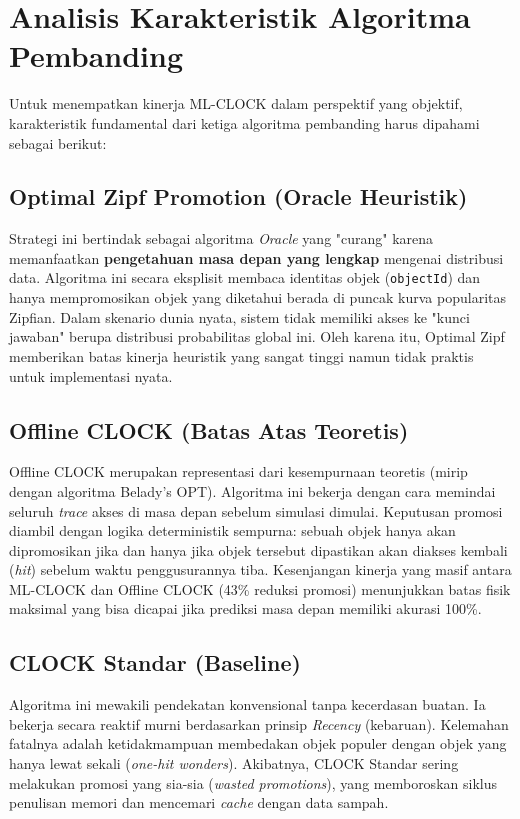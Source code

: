 \section{Analisis Karakteristik Algoritma Pembanding}

Untuk menempatkan kinerja ML-CLOCK dalam perspektif yang objektif,
karakteristik fundamental dari ketiga algoritma pembanding harus
dipahami sebagai berikut:

\subsection{Optimal Zipf Promotion (Oracle Heuristik)}
Strategi ini bertindak sebagai algoritma \textit{Oracle} yang "curang" karena
memanfaatkan \textbf{pengetahuan masa depan yang lengkap} mengenai
distribusi data.
Algoritma ini secara eksplisit membaca identitas objek
(\texttt{objectId}) dan hanya mempromosikan
objek yang diketahui berada di puncak kurva popularitas Zipfian.
Dalam skenario dunia nyata, sistem tidak memiliki akses ke "kunci jawaban"
berupa distribusi probabilitas global ini.
Oleh karena itu, Optimal Zipf memberikan batas kinerja heuristik yang
sangat tinggi namun tidak praktis untuk implementasi nyata.

\subsection{Offline CLOCK (Batas Atas Teoretis)}
Offline CLOCK merupakan representasi dari kesempurnaan teoretis
(mirip dengan algoritma Belady's OPT).
Algoritma ini bekerja dengan cara memindai seluruh \textit{trace}
akses di masa depan sebelum simulasi dimulai.
Keputusan promosi diambil dengan logika deterministik sempurna:
sebuah objek hanya akan dipromosikan jika dan hanya jika objek tersebut
dipastikan akan diakses kembali (\textit{hit}) sebelum waktu
penggusurannya tiba.
Kesenjangan kinerja yang masif antara ML-CLOCK dan Offline CLOCK
(43\% reduksi promosi)
menunjukkan batas fisik maksimal yang bisa dicapai jika prediksi masa
depan memiliki akurasi 100\%.

\subsection{CLOCK Standar (Baseline)}
Algoritma ini mewakili pendekatan konvensional tanpa kecerdasan buatan.
Ia bekerja secara reaktif murni berdasarkan prinsip \textit{Recency} (kebaruan).
Kelemahan fatalnya adalah ketidakmampuan membedakan objek populer dengan objek
yang hanya lewat sekali (\textit{one-hit wonders}).
Akibatnya, CLOCK Standar sering melakukan promosi yang sia-sia
(\textit{wasted promotions}),
yang memboroskan siklus penulisan memori dan mencemari \textit{cache}
dengan data sampah.

